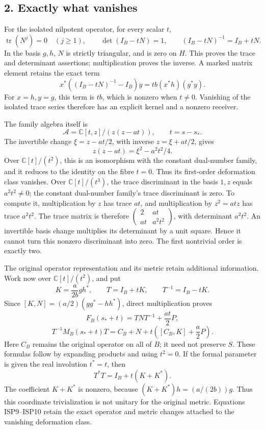 \documentclass[
  10pt,
  a4paper,
]{article}
\begin{document}
\subsection{2. Exactly what vanishes}\label{exactly-what-vanishes}

For the isolated nilpotent operator, for every scalar \(t\), \[
\operatorname{tr}(N^j)=0\quad(j\ge1),\qquad
\det(I_B-tN)=1,\qquad
(I_B-tN)^{-1}=I_B+tN.
\tag{ISP6}
\] In the basis \(g,h\), \(N\) is strictly triangular, and is zero on
\(H\). This proves the trace and determinant assertions; multiplication
proves the inverse. A marked matrix element retains the exact term \[
x^*((I_B-tN)^{-1}-I_B)y
=tb(x^*h)(g^*y).
\tag{ISP7}
\] For \(x=h,y=g\), this term is \(tb\), which is nonzero when
\(t\ne0\). Vanishing of the isolated trace series therefore has an
explicit kernel and a nonzero receiver.

The family algebra itself is \[
\mathcal A=\mathbb C[t,z]/(z(z-at)),\qquad t=s-s_*.
\] The invertible change \(\xi=z-at/2\), with inverse \(z=\xi+at/2\),
gives \[
z(z-at)=\xi^2-a^2t^2/4.
\tag{ISP8}
\] Over \(\mathbb C[t]/(t^2)\), this is an isomorphism with the constant
dual-number family, and it reduces to the identity on the fibre \(t=0\).
Thus its first-order deformation class vanishes. Over
\(\mathbb C[t]/(t^3)\), the trace discriminant in the basis \(1,z\)
equals \(a^2t^2\ne0\); the constant dual-number family's trace
discriminant is zero. To compute it, multiplication by \(z\) has trace
\(at\), and multiplication by \(z^2=at z\) has trace \(a^2t^2\). The
trace matrix is therefore
\(\left(\begin{smallmatrix}2&at\\at&a^2t^2\end{smallmatrix}\right)\),
with determinant \(a^2t^2\). An invertible basis change multiplies its
determinant by a unit square. Hence it cannot turn this nonzero
discriminant into zero. The first nontrivial order is exactly two.

The original operator representation and its metric retain additional
information. Work now over \(\mathbb C[t]/(t^2)\), and put \[
K=\frac{a}{2b}gh^*,\qquad T=I_B+tK,\qquad T^{-1}=I_B-tK.
\] Since \([K,N]=(a/2)(gg^*-hh^*)\), direct multiplication proves \[
F_B(s_*+t)=TNT^{-1}+\frac{at}{2}P,
\] \[
T^{-1}M_B(s_*+t)T
=C_B+N+t\left([C_B,K]+\frac a2P\right).
\tag{ISP9}
\] Here \(C_B\) remains the original operator on all of \(B\); it need
not preserve \(S\). These formulas follow by expanding products and
using \(t^2=0\). If the formal parameter is given the real involution
\(t^*=t\), then \[
T^*T=I_B+t(K+K^*).
\tag{ISP10}
\] The coefficient \(K+K^*\) is nonzero, because \((K+K^*)h=(a/(2b))g\).
Thus this coordinate trivialization is not unitary for the original
metric. Equations ISP9--ISP10 retain the exact operator and metric
changes attached to the vanishing deformation class.
\end{document}
